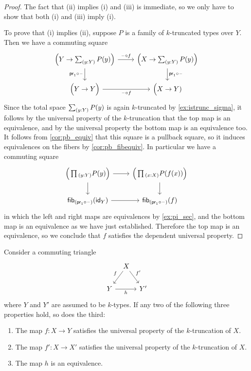 \begin{proof}
  The fact that (ii) implies (i) and (iii) is immediate, so we only have to show that both (i) and (iii) imply (i).

  To prove that (i) implies (ii), suppose $P$ is a family of $k$-truncated types over $Y$.  
  Then we have a commuting square
  \begin{equation*}
    \begin{tikzcd}
      \Big(Y\to\sm{y:Y}P(y)\Big) \arrow[r,"\blank\circ f"] \arrow[d,swap,"\proj 1 \circ\blank"] & \Big(X\to \sm{y:Y}P(y)\Big) \arrow[d,"\proj 1\circ \blank"] \\
      \Big(Y\to Y\Big) \arrow[r,swap,"\blank\circ f"] & \Big(X\to Y)
    \end{tikzcd}
  \end{equation*}
  Since the total space $\sm{y:Y}P(y)$ is again $k$-truncated by \cref{ex:istrunc_sigma}, it follows by the universal property of the $k$-truncation that the top map is an equivalence, and by the universal property the bottom map is an equivalence too. It follows from \cref{cor:pb_equiv} that this square is a pullback square, so it induces equivalences on the fibers by \cref{cor:pb_fibequiv}. In particular we have a commuting square
  \begin{equation*}
    \begin{tikzcd}
      \Big(\prd{y:Y}P(y)\Big) \arrow[r] \arrow[d] & \Big(\prd{x:X}P(f(x))\Big) \arrow[d] \\
      \fib{(\proj 1\circ \blank)}{\idfunc[Y]} \arrow[r] & \fib{(\proj 1 \circ \blank)}{f}
    \end{tikzcd}
  \end{equation*}
  in which the left and right maps are equivalences by \cref{ex:pi_sec}, and the bottom map is an equivalence as we have just established. Therefore the top map is an equivalence, so we conclude that $f$ satisfies the dependent universal property.
\end{proof}

\begin{prp}
  Consider a commuting triangle
  \begin{equation*}
    \begin{tikzcd}[column sep=tiny]
      \phantom{Y'} & X \arrow[dl,swap,"f"] \arrow[dr,"{f'}"] \\
      Y \arrow[rr,swap,"h"] & & Y'
    \end{tikzcd}
  \end{equation*}
  where $Y$ and $Y'$ are assumed to be $k$-types. If any two of the following three properties hold, so does the third:
  \begin{enumerate}
  \item The map $f:X\to Y$ satisfies the universal property of the $k$-truncation of $X$.
  \item The map $f':X\to X'$ satisfies the universal property of the $k$-truncation of $X$.
  \item The map $h$ is an equivalence.
  \end{enumerate}
\end{prp}

